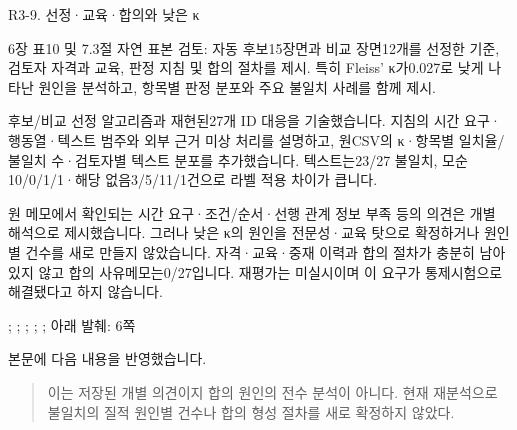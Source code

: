 \begin{reviewitem}{R3-9. 선정·교육·합의와 낮은 κ}

\begin{reviewercomment}

6장 표10 및 7.3절 자연 표본 검토: 자동 후보15장면과 비교 장면12개를 선정한 기준, 검토자 자격과 교육, 판정 지침 및 합의 절차를 제시. 특히 Fleiss' κ가0.027로 낮게 나타난 원인을 분석하고, 항목별 판정 분포와 주요 불일치 사례를 함께 제시.

\end{reviewercomment}

\begin{authorresponse}

후보/비교 선정 알고리즘과 재현된27개 ID 대응을 기술했습니다. 지침의 시간 요구·행동열·텍스트 범주와 외부 근거 미상 처리를 설명하고, 원CSV의 κ·항목별 일치율/불일치 수·검토자별 텍스트 분포를 추가했습니다. 텍스트는23/27 불일치, 모순10/0/1/1·해당 없음3/5/11/1건으로 라벨 적용 차이가 큽니다.

원 메모에서 확인되는 시간 요구·조건/순서·선행 관계 정보 부족 등의 의견은 개별 해석으로 제시했습니다. 그러나 낮은 κ의 원인을 전문성·교육 탓으로 확정하거나 원인별 건수를 새로 만들지 않았습니다. 자격·교육·중재 이력과 합의 절차가 충분히 남아 있지 않고 합의 사유메모는0/27입니다. 재평가는 미실시이며 이 요구가 통제시험으로 해결됐다고 하지 않습니다.

\end{authorresponse}

\begin{manuscriptrevision}{; ; ; ; ; 아래 발췌: 6쪽}

본문에 다음 내용을 반영했습니다.

\begin{quote}

이는 저장된 개별 의견이지 합의 원인의 전수 분석이 아니다. 현재 재분석으로 불일치의 질적 원인별 건수나 합의 형성 절차를 새로 확정하지 않았다.

\end{quote}

\end{manuscriptrevision}

\end{reviewitem}

\clearpage

